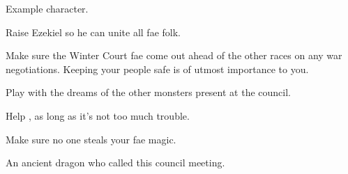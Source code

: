 \documentclass[char]{guardians}
\begin{document}
\name{\cMatt{}}

Example character.

\begin{itemz}[Goals]
  \item Raise Ezekiel so he can unite all fae folk.
  \item Make sure the Winter Court fae come out ahead of the other races on any war negotiations. Keeping your people safe is of utmost importance to you.
  \item Play with the dreams of the other monsters present at the council.
  \item Help \cMatt{}, as long as it's not too much trouble.
  \item Make sure no one steals your fae magic.
\end{itemz}


\begin{contacts}
  \contact{\cMatt{}} An ancient dragon who called this council meeting.
\end{contacts}
\end{document}
